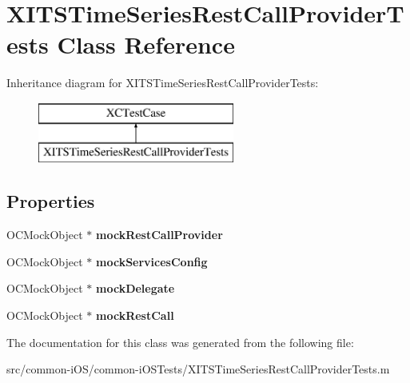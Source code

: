 \hypertarget{interface_x_i_t_s_time_series_rest_call_provider_tests}{}\section{X\+I\+T\+S\+Time\+Series\+Rest\+Call\+Provider\+Tests Class Reference}
\label{interface_x_i_t_s_time_series_rest_call_provider_tests}
Inheritance diagram for X\+I\+T\+S\+Time\+Series\+Rest\+Call\+Provider\+Tests\+:\begin{figure}[H]
\begin{center}
\leavevmode
\includegraphics[height=2.000000cm]{interface_x_i_t_s_time_series_rest_call_provider_tests}
\end{center}
\end{figure}
\subsection*{Properties}
\begin{DoxyCompactItemize}
\item 
\hypertarget{interface_x_i_t_s_time_series_rest_call_provider_tests_ae000434266940d06c88815dc857f1448}{}\label{interface_x_i_t_s_time_series_rest_call_provider_tests_ae000434266940d06c88815dc857f1448} 
O\+C\+Mock\+Object $\ast$ {\bfseries mock\+Rest\+Call\+Provider}
\item 
\hypertarget{interface_x_i_t_s_time_series_rest_call_provider_tests_a58ec0ce7590b00d6ca6e2441568bd15d}{}\label{interface_x_i_t_s_time_series_rest_call_provider_tests_a58ec0ce7590b00d6ca6e2441568bd15d} 
O\+C\+Mock\+Object $\ast$ {\bfseries mock\+Services\+Config}
\item 
\hypertarget{interface_x_i_t_s_time_series_rest_call_provider_tests_a56633523a4295ac87bef99293babc6dd}{}\label{interface_x_i_t_s_time_series_rest_call_provider_tests_a56633523a4295ac87bef99293babc6dd} 
O\+C\+Mock\+Object $\ast$ {\bfseries mock\+Delegate}
\item 
\hypertarget{interface_x_i_t_s_time_series_rest_call_provider_tests_a3675e14a2fbf86ce9837a45e894eb7e7}{}\label{interface_x_i_t_s_time_series_rest_call_provider_tests_a3675e14a2fbf86ce9837a45e894eb7e7} 
O\+C\+Mock\+Object $\ast$ {\bfseries mock\+Rest\+Call}
\end{DoxyCompactItemize}


The documentation for this class was generated from the following file\+:\begin{DoxyCompactItemize}
\item 
src/common-\/i\+O\+S/common-\/i\+O\+S\+Tests/X\+I\+T\+S\+Time\+Series\+Rest\+Call\+Provider\+Tests.\+m\end{DoxyCompactItemize}
